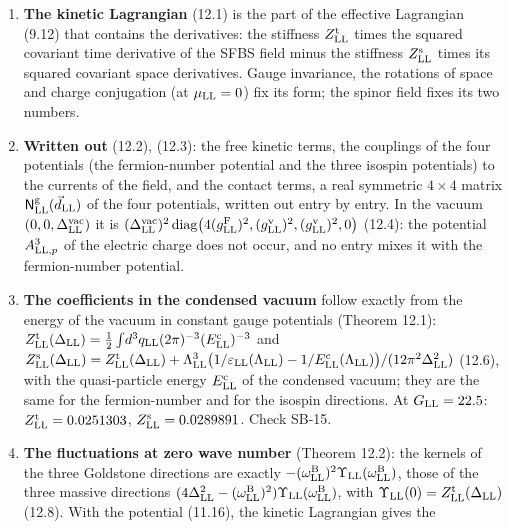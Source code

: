\documentclass[
  10pt,
]{article}
\providecommand{\tightlist}{%
  \setlength{\itemsep}{0pt}\setlength{\parskip}{0pt}}
\begin{document}
\begin{enumerate}
\def\labelenumi{\arabic{enumi}.}
\tightlist
\item
  \textbf{The kinetic Lagrangian} (12.1) is the part of the effective
  Lagrangian (9.12) that contains the derivatives: the stiffness
  \(Z^{\rm t}_{\rm LL}\) times the squared covariant time derivative of
  the SFBS field minus the stiffness \(Z^{\rm s}_{\rm LL}\) times its
  squared covariant space derivatives. Gauge invariance, the rotations
  of space and charge conjugation (at \(\mu_{\rm LL}=0\)) fix its form;
  the spinor field fixes its two numbers.
\item
  \textbf{Written out} (12.2), (12.3): the free kinetic terms, the
  couplings of the four potentials (the fermion-number potential and the
  three isospin potentials) to the currents of the field, and the
  contact terms, a real symmetric \(4\times4\) matrix
  \(\mathsf N^{\rm g}_{\rm LL}(\vec d_{\rm LL})\) of the four
  potentials, written out entry by entry. In the vacuum
  \((0,0,\Delta^{\rm vac}_{\rm LL})\) it is
  \((\Delta^{\rm vac}_{\rm LL})^2\,{\rm diag}\big(4(g^{\rm F}_{\rm LL})^2,(g^{\rm v}_{\rm LL})^2,(g^{\rm v}_{\rm LL})^2,0\big)\)
  (12.4): the potential \(A^3_{{\rm LL},p}\) of the electric charge does
  not occur, and no entry mixes it with the fermion-number potential.
\item
  \textbf{The coefficients in the condensed vacuum} follow exactly from
  the energy of the vacuum in constant gauge potentials (Theorem 12.1):
  \(Z^{\rm t}_{\rm LL}(\Delta_{\rm LL})=\tfrac12\int\!d^3q_{\rm LL}(2\pi)^{-3}(E^{\rm c}_{\rm LL})^{-3}\)
  and
  \(Z^{\rm s}_{\rm LL}(\Delta_{\rm LL})=Z^{\rm t}_{\rm LL}(\Delta_{\rm LL})+\Lambda_{\rm LL}^3\big(1/\varepsilon_{\rm LL}(\Lambda_{\rm LL})-1/E^{\rm c}_{\rm LL}(\Lambda_{\rm LL})\big)/(12\pi^2\Delta_{\rm LL}^2)\)
  (12.6), with the quasi-particle energy \(E^{\rm c}_{\rm LL}\) of the
  condensed vacuum; they are the same for the fermion-number and for the
  isospin directions. At \(G_{\rm LL}=22.5\):
  \(Z^{\rm t}_{\rm LL}=0.0251303\), \(Z^{\rm s}_{\rm LL}=0.0289891\).
  Check SB-15.
\item
  \textbf{The fluctuations at zero wave number} (Theorem 12.2): the
  kernels of the three Goldstone directions are exactly
  \(-(\omega^{\rm B}_{\rm LL})^2\Upsilon_{\rm LL}(\omega^{\rm B}_{\rm LL})\),
  those of the three massive directions
  \((4\Delta_{\rm LL}^2-(\omega^{\rm B}_{\rm LL})^2)\Upsilon_{\rm LL}(\omega^{\rm B}_{\rm LL})\),
  with \(\Upsilon_{\rm LL}(0)=Z^{\rm t}_{\rm LL}(\Delta_{\rm LL})\)
  (12.8). With the potential (11.16), the kinetic Lagrangian gives the

\end{enumerate}
\end{document}
